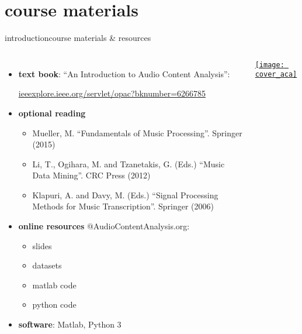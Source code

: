     \section[course materials]{course materials}
        \begin{frame}{introduction}{course materials \& resources}
            \vspace{-4mm}
            \begin{columns}[T]
                    \begin{itemize}
                        \item   \textbf{text book}: ``An Introduction to Audio Content Analysis'':
                        
                            \href{https://ieeexplore.ieee.org/servlet/opac?bknumber=6266785}{ieeexplore.ieee.org/servlet/opac?bknumber=6266785}

                        \smallskip
                        \item<2->  \textbf{optional reading}
                            
                            \begin{itemize}
                                \item   \footnotesize Mueller, M. ``Fundamentals of Music Processing''. Springer (2015)
                                \item   \footnotesize Li, T., Ogihara, M. and Tzanetakis, G.  (Eds.) ``Music Data Mining''. CRC Press (2012)
                                \item   \footnotesize Klapuri, A. and Davy, M. (Eds.) ``Signal Processing Methods for Music Transcription''. Springer (2006)
                            \end{itemize}
                            \normalsize

                        \smallskip
                        \item<3->   \textbf{online resources} @AudioContentAnalysis.org: 
                            \begin{itemize}
                                \item   slides
                                \item   datasets
                                \item   matlab code
                                \item   python code
                            \end{itemize}
                        \smallskip
                        \item<4->   \textbf{software}: Matlab, Python 3
                    \end{itemize}
                     \href{https://ieeexplore.ieee.org/servlet/opac?bknumber=6266785}{\texttt{[image: cover\_aca]}}
                    \vspace{40mm}
             \end{columns}
       \end{frame}


